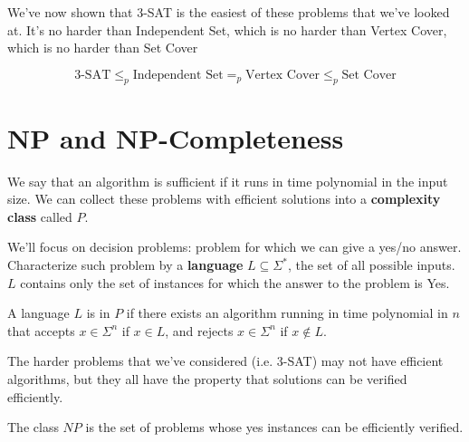 \documentclass[12pt]{article}
\begin{document}
  We've now shown that 3-SAT is the easiest of these problems that we've looked
  at. It's no harder than Independent Set, which is no harder than Vertex
  Cover, which is no harder than Set Cover

  \[
    \text{3-SAT} \le_p \text{Independent Set} =_p \text{Vertex Cover} \le_p
    \text{Set Cover}
  \]

  \section{NP and NP-Completeness}

  We say that an algorithm is sufficient if it runs in time polynomial in the
  input size. We can collect these problems with efficient solutions into a {\bf
  complexity class} called $P$.

  We'll focus on decision problems: problem for which we can give a yes/no
  answer. Characterize such problem by a {\bf language} $L \subseteq \Sigma^*$,
  the set of all possible inputs. $L$ contains only the set of instances for
  which the answer to the problem is Yes.

  A language $L$ is in $P$ if there exists an algorithm running in time
  polynomial in $n$ that accepts $x \in \Sigma^n$ if $x \in L$, and rejects $x
  \in \Sigma^n$ if $x \not\in L$.


  The harder problems that we've considered (i.e. 3-SAT) may not have efficient
  algorithms, but they all have the property that solutions can be verified
  efficiently.


  The class $NP$ is the set of problems whose yes instances can be efficiently
  verified.

\end{document}

